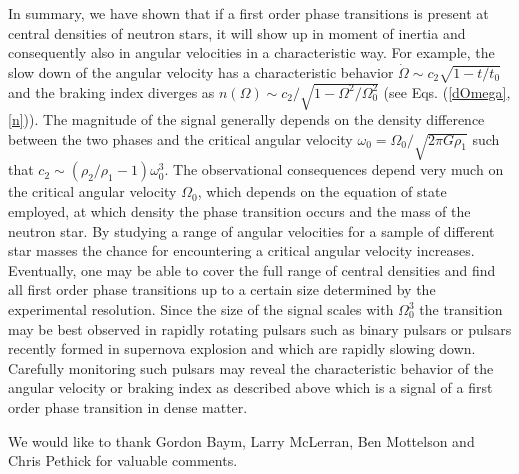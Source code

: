 \begin{multicols}{2}
In summary, we have shown that if a first order phase transitions is
present at central densities of neutron stars, it will show up in
moment of inertia and consequently also in angular velocities in a
characteristic way.
For example, the slow down of the angular velocity
has a characteristic behavior $\dot{\Omega}\sim
c_2\sqrt{1-t/t_0}$ and the braking index diverges as $n(\Omega)\sim
c_2/\sqrt{1-\Omega^2/\Omega_0^2}$ (see Eqs. (\ref{dOmega},\ref{n})).
The magnitude of the signal generally depends on the density
difference between the two phases and the critical angular velocity
$\omega_0=\Omega_0/\sqrt{2\pi G\rho_1}$ such that
$c_2\sim(\rho_2/\rho_1-1)\omega_0^3$.  The observational consequences
depend very much on the critical angular velocity $\Omega_0$, which
depends on the equation of state employed, at which density the phase
transition occurs and the mass of the neutron star. By studying a
range of angular velocities for a sample of different star masses the
chance for encountering a critical angular velocity increases.
Eventually, one may be able to cover the full range of central
densities and find all first order phase transitions up to a certain size
determined by the experimental resolution.  Since the size of the
signal scales with $\Omega_0^3$ the transition may be best observed in
rapidly rotating pulsars such as binary pulsars or pulsars recently
formed in supernova explosion and which are rapidly slowing
down. Carefully monitoring such pulsars may reveal the characteristic
behavior of the angular velocity or braking index as
described above which is a signal of a first order phase transition in
dense matter.

\acknowledgments
We would like to thank Gordon Baym, Larry McLerran, Ben Mottelson and
Chris Pethick for valuable comments.

\begin{references} 


\end{references}
\end{multicols}
